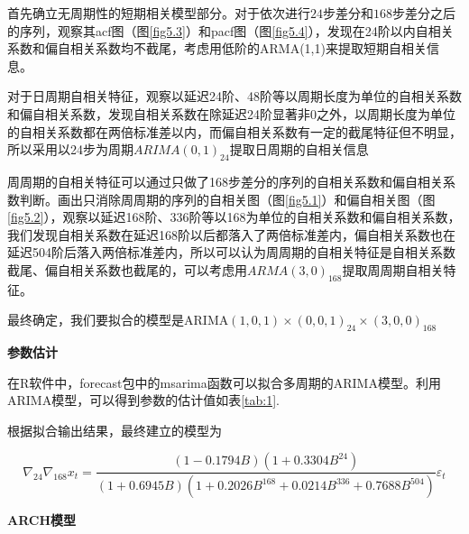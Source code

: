 \documentclass[lang=cn,11pt,a4paper]{elegantpaper}
\begin{document}
首先确立无周期性的短期相关模型部分。对于依次进行$24$步差分和$168$步差分之后的序列，观察其acf图（图\ref{fig5.3}）和pacf图（图\ref{fig5.4}），发现在24阶以内自相关系数和偏自相关系数均不截尾，考虑用低阶的ARMA(1,1)来提取短期自相关信息。

对于日周期自相关特征，观察以延迟24阶、48阶等以周期长度为单位的自相关系数和偏自相关系数，发现自相关系数在除延迟24阶显著非0之外，以周期长度为单位的自相关系数都在两倍标准差以内，而偏自相关系数有一定的截尾特征但不明显，所以采用以24步为周期$ARIMA(0,1)_{24}$提取日周期的自相关信息

周周期的自相关特征可以通过只做了168步差分的序列的自相关系数和偏自相关系数判断。画出只消除周周期的序列的自相关图（图\ref{fig5.1}）和偏自相关图（图\ref{fig5.2}），观察以延迟168阶、336阶等以168为单位的自相关系数和偏自相关系数，我们发现自相关系数在延迟168阶以后都落入了两倍标准差内，偏自相关系数也在延迟504阶后落入两倍标准差内，所以可以认为周周期的自相关特征是自相关系数截尾、偏自相关系数也截尾的，可以考虑用$ARMA(3,0)_{168}$提取周周期自相关特征。

最终确定，我们要拟合的模型是$\mathrm{ARIMA}(1,0,1)\times(0,0,1)_{24}\times(3,0,0)_{168}$

\textbf{参数估计}

在R软件中，forecast包中的msarima函数可以拟合多周期的ARIMA模型。利用ARIMA模型，可以得到参数的估计值如表\ref{tab:1}.

\begin{table}[!htbp]
\caption{ARIMA(1,0,1)(0,0,1)[24](3,0,0)[168]参数拟合结果}
\centering
\label{tab:1}
\end{table}

根据拟合输出结果，最终建立的模型为

\begin{equation}
\nabla_{24}\nabla_{168}x_t=\frac{(1-0.1794B)(1+0.3304B^{24})}{(1+0.6945B)(1+0.2026B^{168}+0.0214B^{336}+0.7688B^{504})}\varepsilon_t
\end{equation}

\textbf{ARCH模型}
\end{document}
